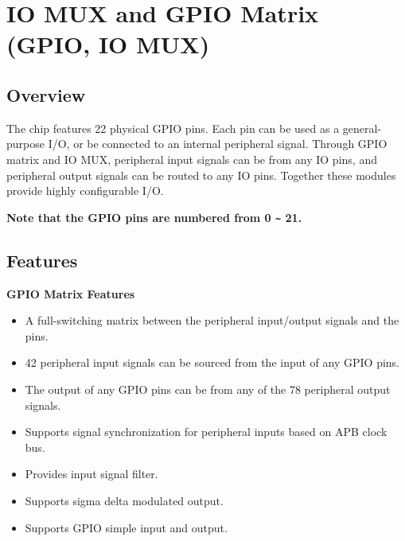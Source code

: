 \documentclass[main\_\_EN.tex]{subfiles}
\begin{document}

\ifglobal
\else
    {\let\clearpage\relax \listoftodos}
    \tableofcontents
\fi

\hypertarget{iomuxgpio}{}
\chapter{IO MUX and GPIO Matrix (GPIO, IO MUX)}
\label{mod:iomuxgpio}

\section{Overview}

The \chipname{} chip features 22 physical GPIO pins. Each pin can be used as a general-purpose I/O, or be connected to an internal peripheral signal. Through GPIO matrix and IO MUX, peripheral input signals can be from any IO pins, and peripheral output signals can be routed to any IO pins. Together these modules provide highly configurable I/O. 

{\bfseries Note that the GPIO pins are numbered from 0 \verb+~+ 21.}

\section{Features}

\textbf{GPIO Matrix Features}

\begin{itemize}
\item A full-switching matrix between the peripheral input/output signals and the pins. 
\item 42 peripheral input signals can be sourced from the input of any GPIO pins. 
\item The output of any GPIO pins can be from any of the 78 peripheral output signals. 
\item Supports signal synchronization for peripheral inputs based on APB clock bus.
\item Provides input signal filter.
\item Supports sigma delta modulated output.
\item Supports GPIO simple input and output.
\end{itemize}
\end{document}
